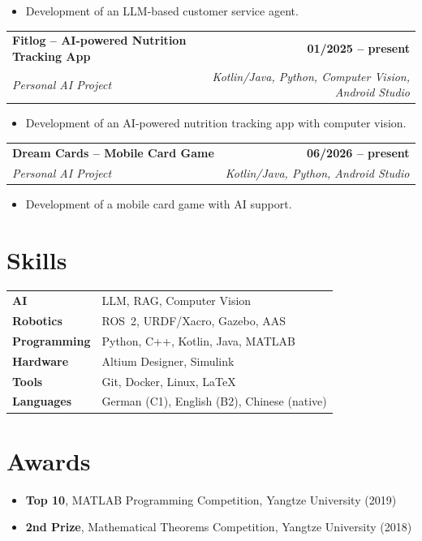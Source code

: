 \documentclass[a4paper,11pt]{article}
\makeatletter
\newcommand{\resumeEntry}[5]{
  \vspace{1.5mm}
  \noindent
  \begin{tabular*}{\textwidth}{@{\extracolsep{\fill}}lr}
    \textbf{#1} & \textbf{\color{darkblue}#4} \\
    \textit{#3} & \textit{\small #5} \\
  \end{tabular*}
  \par
  \ifstrempty{#2}{}{%
    \vspace{0.4mm}
    \noindent
    {\small \faGithub\ \href{https://#2}{#2}}
    \par
  }
}
\makeatother
\begin{document}
\begin{itemize}
\item Development of an LLM-based customer service agent.
\end{itemize}

\resumeEntry
  {Fitlog -- AI-powered Nutrition Tracking App}
  {}
  {Personal AI Project}
  {01/2025 -- present}
  {Kotlin/Java, Python, Computer Vision, Android Studio}

\begin{itemize}
\item Development of an AI-powered nutrition tracking app with computer vision.
\end{itemize}

\resumeEntry
  {Dream Cards -- Mobile Card Game}
  {}
  {Personal AI Project}
  {06/2026 -- present}
  {Kotlin/Java, Python, Android Studio}

\begin{itemize}
\item Development of a mobile card game with AI support.
\end{itemize}


\section{Skills}

\begin{tabular}{@{}ll@{}}
\textbf{AI} & LLM, RAG, Computer Vision \\
\textbf{Robotics} & ROS~2, URDF/Xacro, Gazebo, AAS \\
\textbf{Programming} & Python, C++, Kotlin, Java, MATLAB \\
\textbf{Hardware} & Altium Designer, Simulink \\
\textbf{Tools} & Git, Docker, Linux, \LaTeX \\
\textbf{Languages} & German (C1), English (B2), Chinese (native) \\
\end{tabular}

\section{Awards}
\begin{itemize}
    \item \textbf{Top 10}, MATLAB Programming Competition, Yangtze University (2019)
    \item \textbf{2nd Prize}, Mathematical Theorems Competition, Yangtze University (2018)
\end{itemize}
\end{document}
